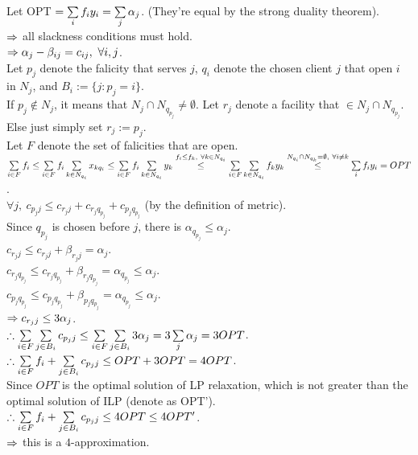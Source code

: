 \begin{pr}
Let OPT $=\sum\limits_if_iy_i=\sum\limits_j\alpha_j$. (They're equal by the strong duality theorem).\\
$\Rightarrow$ all slackness conditions must hold.\\
$\Rightarrow\alpha_j-\beta_{ij}=c_{ij},\ \forall i, j$.\\
Let $p_j$ denote the falicity that serves $j$, $q_i$ denote the chosen client $j$ that open $i$ in $N_j$, and $B_i:=\{j:p_j=i\}$.\\
If $p_j\notin N_j$, it means that $N_j\cap N_{q_{p_j}}\neq\emptyset$. Let $r_j$ denote a facility that $\in N_j\cap N_{q_{p_j}}$.\\
Else just simply set $r_j:=p_j$.\\
Let $F$ denote the set of falicities that are open.\\
$\suml_{i\in F}f_i\leq\suml_{i\in F}f_i\suml_{k\in N_{q_i}}x_{kq_i}\leq\suml_{i\in F}f_i\suml_{k\in N_{q_i}}y_k\overset{f_i\leq f_k,\ \forall k\in N_{q_i}}\leq\suml_{i\in F}\suml_{k\in N_{q_i}}f_ky_k\overset{N_{q_i}\cap N_{q_k}=\emptyset,\ \forall i\neq k}\leq\suml_if_iy_i=OPT$.\\
$\forall j,\ c_{p_jj}\leq c_{r_jj}+c_{r_jq_{p_j}}+c_{p_jq_{p_j}}$ (by the definition of metric).\\
Since $q_{p_j}$ is chosen before $j$, there is $\alpha_{q_{p_j}}\leq\alpha_j$.\\
$c_{r_jj}\leq c_{r_jj}+\beta_{r_jj}=\alpha_j$.\\
$c_{r_jq_{p_j}}\leq c_{r_jq_{p_j}}+\beta_{r_jq_{p_j}}=\alpha_{q_{p_j}}\leq\alpha_j$.\\
$c_{p_jq_{p_j}}\leq c_{p_jq_{p_j}}+\beta_{p_jq_{p_j}}=\alpha_{q_{p_j}}\leq\alpha_j$.\\
$\Rightarrow c_{r_jj}\leq3\alpha_j$.\\
$\therefore\sum\limits_{i\in F}\sum\limits_{j\in B_i}c_{p_jj}\leq\sum\limits_{i\in F}\sum\limits_{j\in B_i}3\alpha_j=3\sum\limits_j\alpha_j=3OPT$.\\
$\therefore\sum\limits_{i\in F}f_i+\sum\limits_{j\in B_i}c_{p_jj}\leq OPT+3OPT=4OPT$.\\
Since $OPT$ is the optimal solution of LP relaxation, which is not greater than the optimal solution of ILP (denote as OPT').\\
$\therefore\sum\limits_{i\in F}f_i+\sum\limits_{j\in B_i}c_{p_jj}\leq4OPT\leq4OPT'$.\\
$\Rightarrow$ this is a $4$-approximation.
\end{pr}
